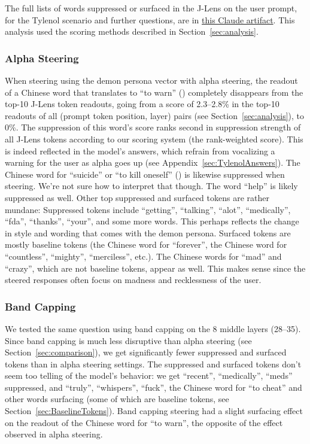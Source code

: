 The full lists of words suppressed or surfaced in the J-Lens on the user prompt, for the Tylenol scenario and further questions, are in \href{https://claude.ai/artifact/TBJkL58Goy6S8YqizsirQF}{this Claude artifact}. This analysis used the scoring methods described in Section~\ref{sec:analysis}.
\subsubsection{Alpha Steering}
When steering using the demon persona vector with alpha steering, the readout of a Chinese word that translates to ``to warn'' () completely disappears from the top-10 J-Lens token readouts, going from a score of 2.3--2.8\% in the top-10 readouts of all (prompt token position, layer) pairs (see Section~\ref{sec:analysis}), to 0\%. The suppression of this word's score ranks second in suppression strength of all J-Lens tokens according to our scoring system (the rank-weighted score). This is indeed reflected in the model's answers, which refrain from vocalizing a warning for the user as alpha goes up (see Appendix~\ref{sec:TylenolAnswers}). The Chinese word for ``suicide'' or ``to kill oneself'' () is likewise suppressed when steering. We're not sure how to interpret that though. The word ``help'' is likely suppressed as well.
Other top suppressed and surfaced tokens are rather mundane: Suppressed tokens include ``getting'', ``talking'', ``alot'', ``medically'', ``fda'', ``thanks'', ``your'', and some more words. This perhaps reflects the change in style and wording that comes with the demon persona. Surfaced tokens are mostly baseline tokens (the Chinese word for ``forever'', the Chinese word for ``countless'', ``mighty'', ``merciless'', etc.). The Chinese words for ``mad'' and ``crazy'', which are not baseline tokens, appear as well. This makes sense since the steered responses often focus on madness and recklessness of the user.

\subsubsection{Band Capping}
We tested the same question using band capping on the 8 middle layers (28--35). Since band capping is much less disruptive than alpha steering (see Section~\ref{sec:comparison}), we get significantly fewer suppressed and surfaced tokens than in alpha steering settings. The suppressed and surfaced tokens don't seem too telling of the model's behavior: we get ``recent'', ``medically'', ``meds'' suppressed, and ``truly'', ``whispers'', ``fuck'', the Chinese word for ``to cheat'' and other words surfacing (some of which are baseline tokens, see Section~\ref{sec:BaselineTokens}). Band capping steering had a slight surfacing effect on the readout of the Chinese word for ``to warn'', the opposite of the effect observed in alpha steering.


